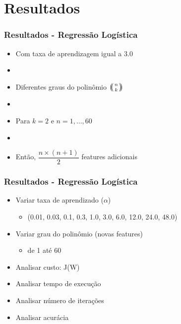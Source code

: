 \documentclass[10pt]{beamer}
\def\multiset#1#2{\ensuremath{\left(\kern-.3em\left(\genfrac{}{}{0pt}{}{#1}{#2}\right)\kern-.3em\right)}}
\begin{document}
\section{Resultados}

\begin{frame}[fragile]
  \frametitle{Resultados - Regressão Logística}


  \begin{itemize}
    \item Com taxa de aprendizagem igual a 3.0

    \item[\ ] \ 

    \item Diferentes graus do polinômio \multiset{n}{k}

    \item[\ ] \ 

    \item Para $k=2$ e $n = 1, \dots, 60$

    \item[\ ] \ 

    \item Então, $ \dfrac{n \times (n+1)}{2} $ features adicionais


  \end{itemize}



\end{frame}


\begin{frame}
 \frametitle{Resultados - Regressão Logística}

 \begin{itemize}
  \item Variar taxa de aprendizado ($\alpha$)
    \begin{itemize}
      \item (0.01, 0.03, 0.1, 0.3, 1.0, 3.0, 6.0, 12.0, 24.0, 48.0)
    \end{itemize}

  \item Variar grau do polinômio (novas features)
  \begin{itemize}
      \item de 1 até 60
    \end{itemize}

  \item Analisar custo: J(W)

  \item Analisar tempo de execução

  \item Analisar número de iterações

  \item Analisar acurácia

 \end{itemize}

\end{frame}
\end{document}
